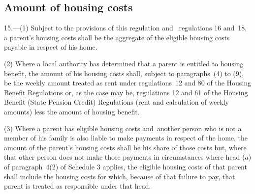 \documentclass[12pt,a4paper]{article}
\begin{document}
\subsection[15. Amount of housing costs]{Amount of housing costs}

15.—(1) Subject to the provisions of this regulation and~
regulations 16 and~18,  %
a parent’s housing costs shall be the aggregate of the eligible housing costs payable in respect of his home.

(2) Where a local authority has determined that a parent is entitled to housing benefit, the amount of his housing costs shall, subject to paragraphs~(4) to (9), be the weekly amount treated as rent under 
regulations~12 and 80 of the Housing Benefit Regulations or, as the case may be, regulations 12 and 61 of the Housing Benefit (State Pension Credit) Regulations  %
(rent and calculation of weekly amounts) less the amount of housing benefit.

(3) Where a parent has eligible housing costs and~another person who is not a member of his family is also liable to make payments in respect of the home, the amount of the parent’s housing costs shall be his share of those costs
but, where that other person does not make those payments in circumstances where head ($a$) of paragraph~4(2) of Schedule 3 applies, the eligible housing costs of that parent shall include the housing costs for which, because of that failure to pay, that parent is treated as responsible under that head.  %
\end{document}
